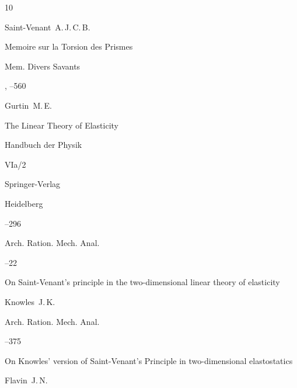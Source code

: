 \begin{thebibliography}{10}




\by Saint-Venant~A.\,J.\,C.\,B.

\paper Memoire sur la Torsion des Prismes

\jour Mem. Divers Savants

 , --560






\by Gurtin~M.\,E. 

\paper The Linear Theory of Elasticity

\inbook Handbuch der Physik

\bookvol VIa/2

\publ Springer-Verlag 

\publaddr Heidelberg 


--296






\jour Arch. Ration. Mech. Anal. 




--22


\paper On Saint-Venant's principle in the two-dimensional linear theory of elasticity

\by Knowles~J.\,K.








\jour Arch. Ration. Mech. Anal. 




--375


\paper On Knowles' version of Saint-Venant's Principle in two-dimensional elastostatics

\by Flavin~J.\,N.






\end{thebibliography}
